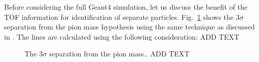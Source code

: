 \documentclass[final,1p,11pt]{elsarticle}
\begin{document}
Before considering the full Geant4 simulation, let us discuss the benefit of the TOF information 
for identification of separate particles. Fig.~\ref{fig:singleparticles} shows the $3\sigma$ separation from the pion
mass hypothesis using the same technique as discussed  in \cite{Cerri:2018rkm}. The lines are calculated
using the following consideration: ADD TEXT 
 
\begin{figure}
\begin{center}
\end{center}
\caption{
The $3\sigma$ separation from the pion mass.. ADD TEXT 
}
\label{fig:singleparticles}
\end{figure}



\clearpage 







\newpage


\def\bibname{\Large\bf References}

\end{document}
